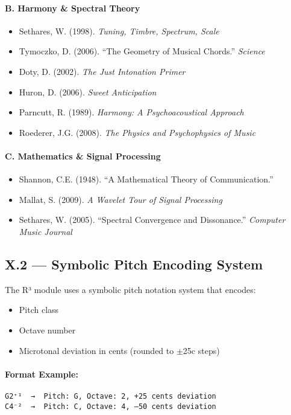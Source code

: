 \documentclass{article}
\begin{document}
\paragraph{B. Harmony \& Spectral Theory}
\begin{itemize}
    \item Sethares, W. (1998). \textit{Tuning, Timbre, Spectrum, Scale}
    \item Tymoczko, D. (2006). “The Geometry of Musical Chords.” \textit{Science}
    \item Doty, D. (2002). \textit{The Just Intonation Primer}
    \item Huron, D. (2006). \textit{Sweet Anticipation}
    \item Parncutt, R. (1989). \textit{Harmony: A Psychoacoustical Approach}
    \item Roederer, J.G. (2008). \textit{The Physics and Psychophysics of Music}
\end{itemize}

\paragraph{C. Mathematics \& Signal Processing}
\begin{itemize}
    \item Shannon, C.E. (1948). “A Mathematical Theory of Communication.”
    \item Mallat, S. (2009). \textit{A Wavelet Tour of Signal Processing}
    \item Sethares, W. (2005). “Spectral Convergence and Dissonance.” \textit{Computer Music Journal}
\end{itemize}

\subsection*{X.2 — Symbolic Pitch Encoding System}

The R³ module uses a symbolic pitch notation system that encodes:

\begin{itemize}
    \item Pitch class
    \item Octave number
    \item Microtonal deviation in cents (rounded to $\pm$25c steps)
\end{itemize}

\paragraph{Format Example:}
\begin{verbatim}
G2⁺¹  →  Pitch: G, Octave: 2, +25 cents deviation
C4⁻²  →  Pitch: C, Octave: 4, –50 cents deviation
\end{verbatim}
\end{document}

